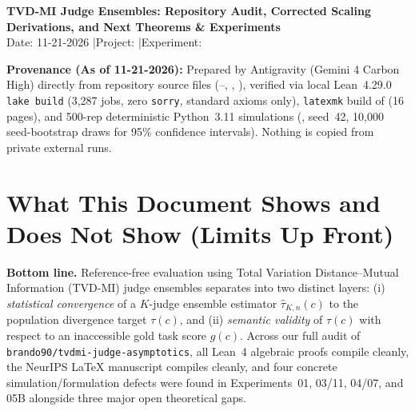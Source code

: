 \documentclass[11pt]{article}
\begin{document}
\begin{center}
{\Large\bfseries TVD-MI Judge Ensembles: Repository Audit, Corrected Scaling Derivations, and Next Theorems \& Experiments}\\[6pt]
{\normalsize Date: 11-21-2026 \quad|\quad Project:  \quad|\quad Experiment: }
\end{center}

\textbf{Provenance (As of 11-21-2026):} Prepared by Antigravity (Gemini 4 Carbon High) directly from repository source files (--, , ), verified via local Lean~4.29.0 \texttt{lake build} (3,287 jobs, zero \texttt{sorry}, standard axioms only), \texttt{latexmk} build of  (16 pages), and 500-rep deterministic Python~3.11 simulations (, seed~42, 10,000 seed-bootstrap draws for 95\% confidence intervals). Nothing is copied from private external runs.

\section{What This Document Shows and Does Not Show (Limits Up Front)}
\label{sec:limits}

\textbf{Bottom line.} Reference-free evaluation using Total Variation Distance--Mutual Information (TVD-MI) judge ensembles separates into two distinct layers: (i) \emph{statistical convergence} of a $K$-judge ensemble estimator $\hat{\tau}_{K,n}(c)$ to the population divergence target $\tau(c)$, and (ii) \emph{semantic validity} of $\tau(c)$ with respect to an inaccessible gold task score $g(c)$. Across our full audit of \texttt{brando90/tvdmi-judge-asymptotics}, all Lean~4 algebraic proofs compile cleanly, the NeurIPS LaTeX manuscript compiles cleanly, and four concrete simulation/formulation defects were found in Experiments~01, 03/11, 04/07, and 05B alongside three major open theoretical gaps.
\end{document}
